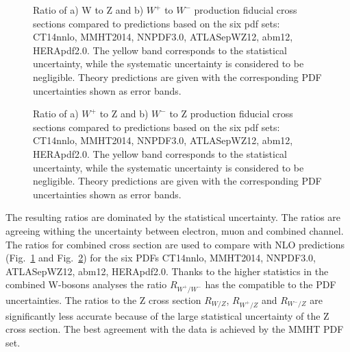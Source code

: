 \begin{figure}[!tbp]
\begin{minipage}[h]{0.45\linewidth}
\end{minipage}
\hfill
\begin{minipage}[h]{0.45\linewidth}
\end{minipage}
\caption{Ratio of  a) W to Z  and b) $W^+$ to $W^-$ production fiducial cross sections compared to predictions based on the six pdf sets:  CT14nnlo, MMHT2014, NNPDF3.0, ATLASepWZ12, abm12, HERApdf2.0. The yellow band corresponds to the statistical uncertainty, while the systematic uncertainty is considered to be negligible. Theory predictions are given with the corresponding PDF uncertainties shown as error bands.}
\label{fig:WRatio}
\end{figure}

\begin{figure}[!tbp]
\begin{minipage}[h]{0.45\linewidth}
\end{minipage}
\hfill
\begin{minipage}[h]{0.45\linewidth}
\end{minipage}
\caption{Ratio of  a) $W^+$  to Z  and b) $W^-$ to Z production fiducial cross sections compared to predictions based on the six pdf sets:  CT14nnlo, MMHT2014, NNPDF3.0, ATLASepWZ12, abm12, HERApdf2.0. The yellow band corresponds to the statistical uncertainty, while the systematic uncertainty is considered to be negligible. Theory predictions are given with the corresponding PDF uncertainties shown as error bands.}
\label{fig:ZRatio}
\end{figure}

The resulting ratios are dominated by the statistical uncertainty. The ratios are agreeing withing the uncertainty between electron, muon and combined channel. The ratios for combined cross section are used to compare with NLO predictions (Fig.~\ref{fig:WRatio} and Fig.~\ref{fig:ZRatio}) for the six PDFs CT14nnlo, MMHT2014, NNPDF3.0, ATLASepWZ12, abm12, HERApdf2.0. Thanks to the higher statistics in the combined W-bosons analyses the ratio $R_{W^{+}/W^{-}}$ has the compatible to the PDF uncertainties. The ratios to the Z cross section $R_{W/Z}$, $R_{W^{+}/Z}$ and $R_{W^{-}/Z}$ are significantly less accurate because of the large statistical uncertainty of the Z cross section. The best agreement with the data is achieved by the MMHT PDF set.




